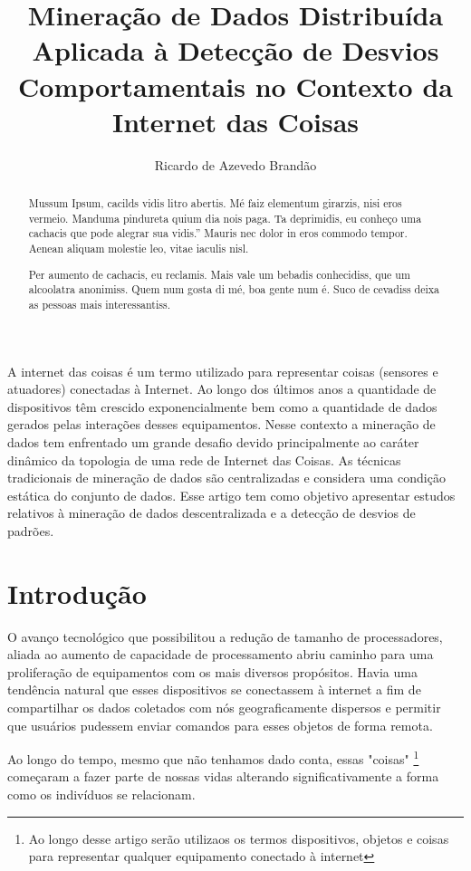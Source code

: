 \documentclass[12pt]{article}
\title{Mineração de Dados Distribuída Aplicada à Detecção de Desvios Comportamentais no Contexto da Internet das Coisas}
\author{Ricardo de Azevedo Brandão\inst{1} }
\begin{document}
 

\maketitle

\begin{abstract}
Mussum Ipsum, cacilds vidis litro abertis. Mé faiz elementum girarzis, nisi eros vermeio. Manduma pindureta quium dia nois paga. Ta deprimidis, eu conheço uma cachacis que pode alegrar sua vidis.” Mauris nec dolor in eros commodo tempor. Aenean aliquam molestie leo, vitae iaculis nisl.

Per aumento de cachacis, eu reclamis. Mais vale um bebadis conhecidiss, que um alcoolatra anonimiss. Quem num gosta di mé, boa gente num é. Suco de cevadiss deixa as pessoas mais interessantiss. 
\end{abstract}
     
\begin{resumo} 
    A internet das coisas é um termo utilizado para representar coisas (sensores e atuadores) conectadas à Internet. Ao longo dos últimos anos a quantidade de dispositivos têm crescido exponencialmente bem como a quantidade de dados gerados pelas interações desses equipamentos. Nesse contexto a mineração de dados tem enfrentado um grande desafio devido principalmente ao caráter dinâmico da topologia de uma rede de Internet das Coisas. As técnicas tradicionais de mineração de dados são centralizadas e considera uma condição estática do conjunto de dados. Esse artigo tem como objetivo apresentar estudos relativos à mineração de dados descentralizada e a detecção de desvios de padrões.
\end{resumo}

\section{Introdução}

O avanço tecnológico que possibilitou a redução de tamanho de processadores, aliada ao aumento de capacidade de processamento abriu caminho para uma proliferação de equipamentos com os mais diversos propósitos. Havia uma tendência natural que esses dispositivos se conectassem à internet a fim de compartilhar os dados coletados com nós geograficamente dispersos e permitir que usuários pudessem enviar comandos para esses objetos de forma remota.

Ao longo do tempo, mesmo que não tenhamos dado conta, essas "coisas" \footnote{Ao longo desse artigo serão utilizaos os termos dispositivos, objetos e coisas para representar qualquer equipamento conectado à internet} começaram a fazer parte de nossas vidas alterando significativamente a forma como os indivíduos se relacionam.
\end{document}
